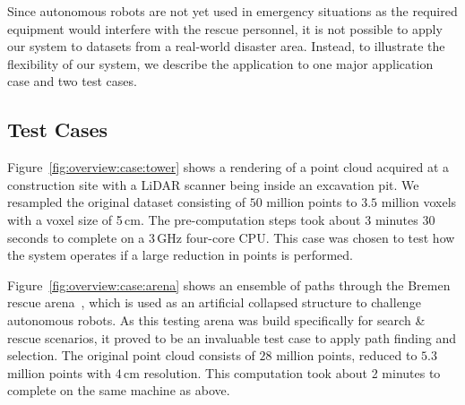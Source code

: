 \documentclass[review,journal]{vgtc}         %
\begin{document}
Since autonomous robots are not yet used in emergency situations as the required equipment would interfere with the rescue personnel, it is not possible to apply our system to datasets from a real-world disaster area. Instead, to illustrate the flexibility of our system, we describe the application to one major application case and two test cases.

\subsection{Test Cases} \label{sec:results:testcases}
 Figure~\ref{fig:overview:case:tower} shows a rendering of a point cloud acquired at a construction site with a LiDAR scanner being inside an excavation pit. We resampled the original dataset consisting of $50$ million points to $3.5$ million voxels with a voxel size of 5\,cm. The pre-computation steps took about 3 minutes 30 seconds to complete on a 3\,GHz four-core CPU. This case was chosen to test how the system operates if a large reduction in points is performed.

 Figure~\ref{fig:overview:case:arena} shows an ensemble of paths through the Bremen rescue arena~\cite{varsadan08}, which is used as an artificial collapsed structure to challenge autonomous robots. As this testing arena was build specifically for search \& rescue scenarios, it proved to be an invaluable test case to apply path finding and selection. The original point cloud consists of $28$ million points, reduced to $5.3$ million points with 4\,cm resolution. This computation took about 2 minutes to complete on the same machine as above.
\end{document}
